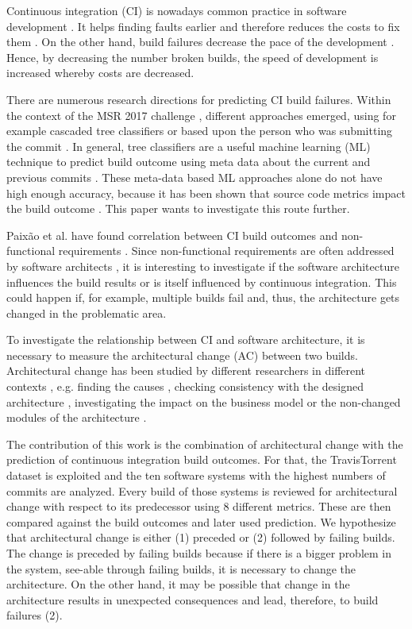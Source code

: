 \documentclass[conference]{IEEEtran}
\begin{document}
Continuous integration (CI) is nowadays common practice in software development \cite{CI-Common}. It helps finding faults earlier and therefore reduces the costs to fix them \cite{NutzenCI}. On the other hand, build failures decrease the pace of the development \cite{Costs-BuildFailures}. Hence, by decreasing the number broken builds, the speed of development is increased whereby costs are decreased.

There are numerous research directions for predicting CI build failures. Within the context of the MSR 2017 challenge \cite{TravisTorrent}, different approaches emerged, using for example cascaded tree classifiers \cite{Pred-Cascade} or based upon the person who was submitting the commit \cite{ContrInvolv}. In general, tree classifiers are a useful machine learning (ML) technique to predict build outcome using meta data about the current and previous commits \cite{Pred-Tree}. 
These meta-data based ML approaches alone do not have high enough accuracy, because it has been shown that source code metrics impact the build outcome \cite{FailsCorr}. This paper wants to investigate this route further. 

Paixão et al. have found correlation between CI build outcomes and non-functional requirements \cite{Fail-NFReq}. Since non-functional requirements are often addressed by software architects \cite{NFR-Architects}, it is interesting to investigate if the software architecture influences the build results or is itself influenced by continuous integration. 
This could happen if, for example, multiple builds fail and, thus, the architecture gets changed in the problematic area.

To investigate the relationship between CI and software architecture, it is necessary to measure the architectural change (AC) between two builds. Architectural change has been studied by different researchers in different contexts \cite{Aramis,StructDist,Arc-MDSE,Arcade-Base} , e.g.  finding the causes \cite{AC-Causes}, checking consistency with the designed architecture \cite{ArcConf, ArcCons}, investigating the impact on the business model \cite{ArcChange-Business} or the non-changed modules of the architecture \cite{Knowledge-AC}. 

The contribution of this work is the combination of architectural change with the prediction of continuous integration build outcomes. For that, the TravisTorrent dataset is exploited and the ten software systems with the highest numbers of commits are analyzed. Every build of those systems is reviewed for architectural change with respect to its predecessor using 8 different metrics. These are then compared against the build outcomes and later used prediction. We hypothesize that architectural change is either (1) preceded or (2) followed by failing builds. 
The change is preceded by failing builds because if there is a bigger problem in the system, see-able through failing builds, it is necessary to change the architecture. 
On the other hand, it may be possible that change in the architecture results in unexpected consequences and lead, therefore, to build failures (2).
\end{document}
